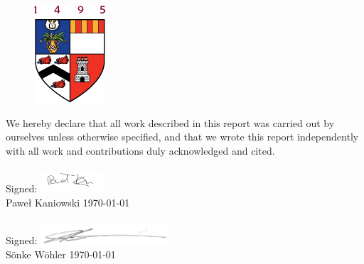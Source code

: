 \documentclass[main.tex]{subfiles}
\begin{document}
  \maketitle
  \thispagestyle{empty}
  
  \begin{figure}[h!]
    \centering
    \includegraphics{otherImages/abdnshield}
    \caption*{}
  \end{figure}
  
  \vfill
  We hereby declare that all work described in this report was carried out by ourselves unless otherwise specified, and that we wrote this report independently with all work and contributions duly acknowledged and cited.
  \\\\
  Signed:
  \hfill \includegraphics[height=0.78cm]{otherImages/pawelSignature}\hspace{1.3cm}
  \\
  Pawe{\l} Kaniowski \hfill \today
  \\\\
  Signed: 
  \hfill \includegraphics[height=0.78cm]{otherImages/sonkiSignature}
  \\
  S\"onke W\"ohler \hfill \today  
  \\
\end{document}
